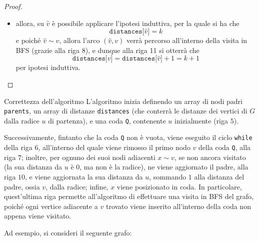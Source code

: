 \documentclass[a4paper, 12pt]{report}
\begin{document}
\begin{proof}
\begin{itemize}
\begin{itemize}
                    \item allora, su $\hat v$ è possibile applicare l'ipotesi induttiva, per la quale si ha che $$\texttt{distances[}\hat v\texttt{]} = k$$ e poiché $\hat v \sim v$, allora l'arco $(\hat v, v)$ verrà percorso all'interno della visita in BFS (grazie alla riga 8), e dunque alla riga 11 si otterrà che $$\texttt{distances[}v\texttt{]} = \texttt{distances[}\hat v\texttt{]} + 1 = k + 1$$ per ipotesi induttiva.
                \end{itemize}
        \end{itemize}
    \end{proof}

    \begin{framedobs}{Correttezza dell'algoritmo}
        L'algoritmo inizia definendo un array di nodi padri \texttt{parents}, un array di distanze \texttt{distances} (che conterrà le distanze dei vertici di $G$ dalla radice $u$ di partenza), e una coda \texttt{Q}, contenente $u$ inizialmente (riga $5$).

        Successivamente, fintanto che la coda \texttt{Q} non è vuota, viene eseguito il ciclo \texttt{while} della riga $6$, all'interno del quale viene rimosso il primo nodo $v$ della coda \texttt{Q}, alla riga $7$; inoltre, per ognuno dei suoi nodi adiacenti $x \sim v$, se non ancora visitato (la sua distanza da $u$ è $0$, ma non è la radice), ne viene aggiornato il padre, alla riga $10$, e viene aggiornata la sua distanza da $u$, sommando $1$ alla distanza del padre, ossia $v$, dalla radice; infine, $x$ viene posizionato in coda. In particolare, quest'ultima riga permette all'algoritmo di effettuare una visita in BFS del grafo, poiché ogni vertice adiacente a $v$ trovato viene inserito all'interno della coda non appena viene visitato.

        Ad esempio, si consideri il seguente grafo:

        \begin{figure}[H]
            \centering
\end{figure}
\end{framedobs}
\end{document}
